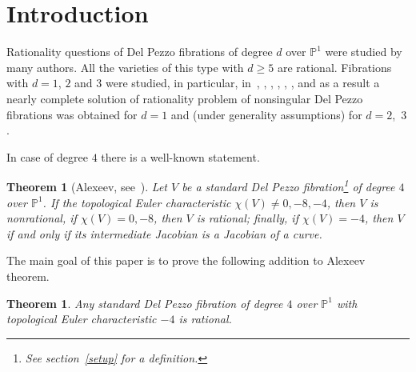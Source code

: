 \documentclass[12pt]{amsart}
\title{\tit}
\author{C.\,Shramov}
\newtheorem{theorem}[equation]{Theorem}
\newtheorem*{theorem*}{Theorem}
\theoremstyle{definition}
\theoremstyle{remark}
\begin{document}
\maketitle

\begin{abstract}
We prove a criterion of nonsingularity of a complete intersection of two fiberwise
quadrics in 
${\mathbb{P}}_{{\mathbb{P}}^1}({\mathcal{O}}(d_1)\oplus\ldots\oplus{\mathcal{O}}(d_5))$. 
As a corollary we derive the following addition to the Alexeev theorem on 
rationality of standard Del Pezzo fibrations of degree $4$ over 
${\mathbb{P}}^1$: 
we prove that any fibration of this kind with the topological Euler 
characteristic $\chi(X)=-4$ is rational.
\end{abstract}


\section{Introduction}

Rationality questions of Del Pezzo fibrations of degree $d$ over 
${\mathbb{P}}^1$ were studied by many authors.
All the varieties of this type with $d\geqslant 5$ are rational. 
Fibrations with $d=1$, $2$ and $3$ were studied, in particular, 
in~\cite{Pukhlikov}, \cite{Grin1}, \cite{Grin2}, \cite{Grin3},
\cite{ChPrSh}, \cite{Cheltsov}, 
and as a result a nearly complete solution of rationality problem of nonsingular
Del Pezzo fibrations was obtained for $d=1$ and (under generality assumptions) 
for $d=2$,~$3$. 


In case of degree $4$ there is a well-known statement.

\begin{theorem*}[Alexeev, see~\cite{Alexeev}]
Let $V$ be a standard Del Pezzo fibration\footnote{See section~\ref{setup}
for a definition.} of degree $4$ over
${\mathbb{P}}^1$. If the topological Euler characteristic 
$\chi(V)\neq 0, -8, -4$, then $V$ is nonrational, if $\chi(V)=0, -8$, then 
$V$ is rational; finally, if $\chi(V)=-4$, then $V$ if and only if
its intermediate Jacobian is a Jacobian of a curve.
\end{theorem*}

The main goal of this paper is to prove the following addition to Alexeev
theorem.

\begin{theorem}\label{theorem:Alexeev-theorem-refined}
Any standard Del Pezzo fibration of degree $4$ over ${\mathbb{P}}^1$ 
with topological Euler characteristic $-4$ is rational.
\end{theorem}
\end{document}
